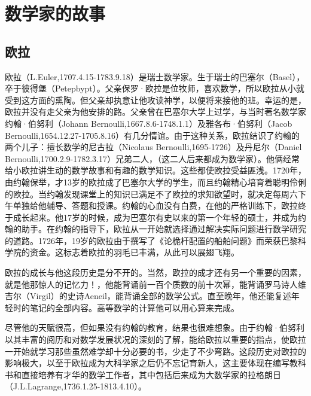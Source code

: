\documentclass[UTF8]{ctexart}
\begin{document}
\section{数学家的故事}

\subsection{欧拉}

欧拉（L.Euler,1707.4.15-1783.9.18）是瑞士数学家。生于瑞士的巴塞尔（Basel），卒于彼得堡（Petepbypt）。父亲保罗·欧拉是位牧师，喜欢数学，所以欧拉从小就受到这方面的熏陶。但父亲却执意让他攻读神学，以便将来接他的班。幸运的是，欧拉并没有走父亲为他安排的路。父亲曾在巴塞尔大学上过学，与当时著名数学家约翰·伯努利（Johann Bernoulli,1667.8.6-1748.1.1）及雅各布·伯努利（Jacob Bernoulli,1654.12.27-1705.8.16）有几分情谊。由于这种关系，欧拉结识了约翰的两个儿子：擅长数学的尼古拉（Nicolaus Bernoulli,1695-1726）及丹尼尔（Daniel Bernoulli,1700.2.9-1782.3.17）兄弟二人，（这二人后来都成为数学家）。他俩经常给小欧拉讲生动的数学故事和有趣的数学知识。这些都使欧拉受益匪浅。1720年，由约翰保举，才13岁的欧拉成了巴塞尔大学的学生，而且约翰精心培育着聪明伶俐的欧拉。当约翰发现课堂上的知识已满足不了欧拉的求知欲望时，就决定每周六下午单独给他辅导、答题和授课。约翰的心血没有白费，在他的严格训练下，欧拉终于成长起来。他17岁的时候，成为巴塞尔有史以来的第一个年轻的硕士，并成为约翰的助手。在约翰的指导下，欧拉从一开始就选择通过解决实际问题进行数学研究的道路。1726年，19岁的欧拉由于撰写了《论桅杆配置的船舶问题》而荣获巴黎科学院的资金。这标志着欧拉的羽毛已丰满，从此可以展翅飞翔。

欧拉的成长与他这段历史是分不开的。当然，欧拉的成才还有另一个重要的因素，就是他那惊人的记忆力！，他能背诵前一百个质数的前十次幂，能背诵罗马诗人维吉尔（Virgil）的史诗Aeneil，能背诵全部的数学公式。直至晚年，他还能复述年轻时的笔记的全部内容。高等数学的计算他可以用心算来完成。

尽管他的天赋很高，但如果没有约翰的教育，结果也很难想象。由于约翰·伯努利以其丰富的阅历和对数学发展状况的深刻的了解，能给欧拉以重要的指点，使欧拉一开始就学习那些虽然难学却十分必要的书，少走了不少弯路。这段历史对欧拉的影响极大，以至于欧拉成为大科学家之后仍不忘记育新人，这主要体现在编写教科书和直接培养有才华的数学工作者，其中包括后来成为大数学家的拉格朗日（J.L.Lagrange,1736.1.25-1813.4.10）。
\end{document}
